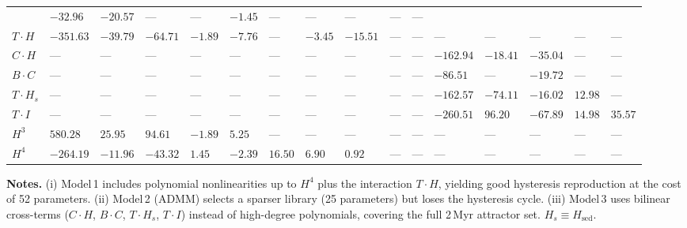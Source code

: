 \documentclass[a4paper,9pt]{article}
\begin{document}
\begin{landscape}
\begin{table}[!ht]
\begin{tabular}{l *{5}{V} *{5}{V} *{5}{V}}
  & $-32.96$ & $-20.57$ & --- & --- & $-1.45$               %
  & --- & --- & --- & --- & ---  \\                          %
$T \cdot H$
  & $-351.63$ & $-39.79$ & $-64.71$ & $-1.89$ & $-7.76$    %
  & --- & $-3.45$ & $-15.51$ & --- & ---                    %
  & --- & --- & --- & --- & ---  \\                          %
\midrule
$C \cdot H$
  & --- & --- & --- & --- & ---                              %
  & --- & --- & --- & --- & ---                              %
  & $-162.94$ & $-18.41$ & $-35.04$ & --- & ---  \\         %
$B \cdot C$
  & --- & --- & --- & --- & ---                              %
  & --- & --- & --- & --- & ---                              %
  & $-86.51$ & --- & $-19.72$ & --- & ---  \\                %
$T \cdot H_s$
  & --- & --- & --- & --- & ---                              %
  & --- & --- & --- & --- & ---                              %
  & $-162.57$ & $-74.11$ & $-16.02$ & $12.98$ & ---  \\     %
$T \cdot I$
  & --- & --- & --- & --- & ---                              %
  & --- & --- & --- & --- & ---                              %
  & $-260.51$ & $96.20$ & $-67.89$ & $14.98$ & $35.57$  \\  %
\midrule
$H^3$
  & $580.28$ & $25.95$ & $94.61$ & $-1.89$ & $5.25$         %
  & --- & --- & --- & --- & ---                              %
  & --- & --- & --- & --- & ---  \\                          %
\midrule
$H^4$
  & $-264.19$ & $-11.96$ & $-43.32$ & $1.45$ & $-2.39$     %
  & $16.50$ & $6.90$ & $0.92$ & --- & ---                   %
  & --- & --- & --- & --- & ---  \\                          %
\bottomrule
\end{tabular}
\end{table}

\vspace{6pt}
\noindent\textbf{Notes.}\;
(i) Model\,1 includes polynomial nonlinearities up to $H^4$ plus the interaction $T\!\cdot\!H$, yielding good hysteresis reproduction at the cost of 52 parameters.
(ii) Model\,2 (ADMM) selects a sparser library (25 parameters) but loses the hysteresis cycle.
(iii) Model\,3 uses bilinear cross-terms ($C\!\cdot\!H$, $B\!\cdot\!C$, $T\!\cdot\!H_s$, $T\!\cdot\!I$) instead of high-degree polynomials, covering the full 2\,Myr attractor set.
$H_s \equiv H_{\mathrm{sed}}$.

\end{landscape}
\end{document}
